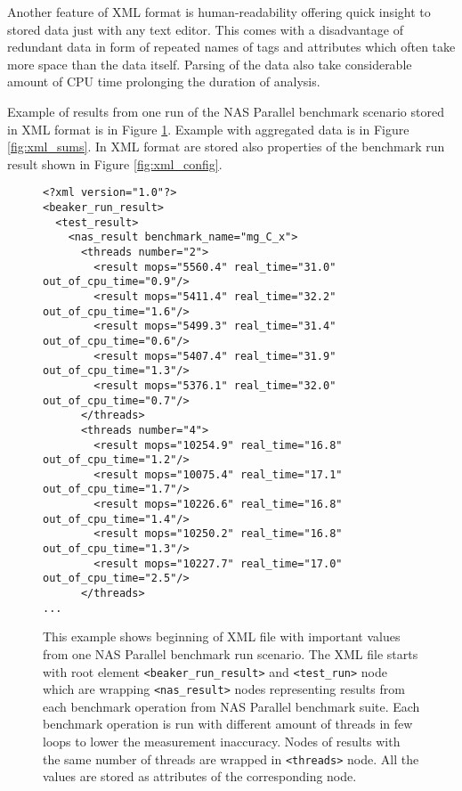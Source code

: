 Another feature of XML format is human-readability offering quick insight to stored
data just with any text editor.
This comes with a disadvantage of redundant data in form of repeated names of
tags and attributes which often take more space than the data itself. Parsing of
the data also take considerable amount of CPU time prolonging the duration of
analysis.


Example of results from one run of the NAS Parallel benchmark scenario stored in
XML format is in Figure \ref{fig:xml_result}. Example with aggregated
data is in Figure \ref{fig:xml_sums}. In XML format are stored also properties
of the benchmark run result shown in Figure \ref{fig:xml_config}.

\begin{figure}
  \small
  \begin{verbatim}
<?xml version="1.0"?>
<beaker_run_result>
  <test_result>
    <nas_result benchmark_name="mg_C_x">
      <threads number="2">
        <result mops="5560.4" real_time="31.0" out_of_cpu_time="0.9"/>
        <result mops="5411.4" real_time="32.2" out_of_cpu_time="1.6"/>
        <result mops="5499.3" real_time="31.4" out_of_cpu_time="0.6"/>
        <result mops="5407.4" real_time="31.9" out_of_cpu_time="1.3"/>
        <result mops="5376.1" real_time="32.0" out_of_cpu_time="0.7"/>
      </threads>
      <threads number="4">
        <result mops="10254.9" real_time="16.8" out_of_cpu_time="1.2"/>
        <result mops="10075.4" real_time="17.1" out_of_cpu_time="1.7"/>
        <result mops="10226.6" real_time="16.8" out_of_cpu_time="1.4"/>
        <result mops="10250.2" real_time="16.8" out_of_cpu_time="1.3"/>
        <result mops="10227.7" real_time="17.0" out_of_cpu_time="2.5"/>
      </threads>
...
\end{verbatim}
  \normalsize
  \caption{This example shows beginning of XML file with important values from one NAS
    Parallel benchmark run scenario. The XML file starts with root element
    \texttt{<beaker\_run\_result>} and \texttt{<test\_run>} node which are wrapping
    \texttt{<nas\_result>} nodes representing results from each benchmark operation
    from NAS Parallel benchmark suite. Each benchmark operation is run with
    different amount of threads in few loops to lower the measurement inaccuracy.
    Nodes of results with the same number of threads are wrapped in
    \texttt{<threads>} node. All the values are stored as attributes of the
    corresponding node.}
  \label{fig:xml_result}
\end{figure}

